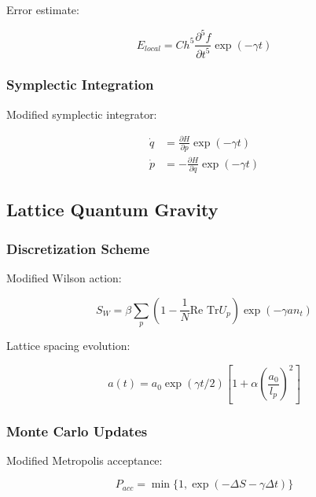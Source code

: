 \documentclass[12pt]{article}
\theoremstyle{plain}
\theoremstyle{definition}
\theoremstyle{remark}
\begin{document}
Error estimate:

\begin{equation}
E_{local} = Ch^5\frac{\partial^5f}{\partial t^5}\exp(-\gamma t)
\end{equation}

\subsubsection{Symplectic Integration}

Modified symplectic integrator:

\begin{equation}
\begin{aligned}
\dot{q} &= \frac{\partial H}{\partial p}\exp(-\gamma t) \\
\dot{p} &= -\frac{\partial H}{\partial q}\exp(-\gamma t)
\end{aligned}
\end{equation}

\subsection{Lattice Quantum Gravity}

\subsubsection{Discretization Scheme}

Modified Wilson action:

\begin{equation}
S_{W} = \beta\sum_p \left(1 - \frac{1}{N}\text{Re Tr}U_p\right)\exp(-\gamma a n_t)
\end{equation}

Lattice spacing evolution:

\begin{equation}
a(t) = a_0\exp(\gamma t/2)\left[1 + \alpha\left(\frac{a_0}{l_p}\right)^2\right]
\end{equation}

\subsubsection{Monte Carlo Updates}

Modified Metropolis acceptance:

\begin{equation}
P_{acc} = \min\{1, \exp(-\Delta S - \gamma\Delta t)\}
\end{equation}
\end{document}
